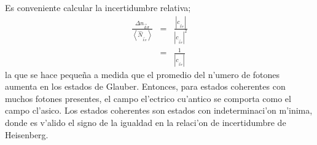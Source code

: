 Es conveniente calcular la incertidumbre relativa;%
\begin{eqnarray}
\frac{\Delta n_{\vec{k}\sigma}}{\left\langle \hat{N}_{_{\vec{k}\sigma}%
}\right> } & = &\frac{|c_{_{\vec{k}\sigma}}|}{|c_{_{\vec{k}\sigma}}|^{2}%
}\\
& = &\frac{1}{|c_{_{\vec{k}\sigma}}|}%
\end{eqnarray}
la que se hace peque\~{n}a a medida que el promedio del n'umero de fotones
aumenta en los estados de Glauber. Entonces, para estados coherentes con
muchos fotones presentes, el campo el'ectrico cu'antico se comporta como
el campo cl'asico. Los estados coherentes son estados con
indeterminaci'on m'inima, donde es v'alido el signo de la igualdad
en la relaci'on de incertidumbre de Heisenberg.
 
